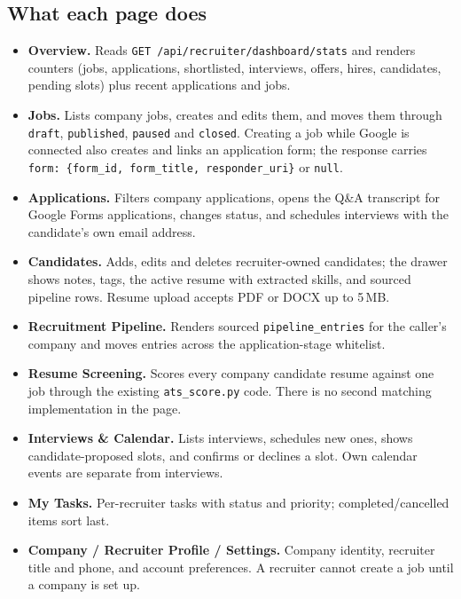 \documentclass[11pt,a4paper]{article}
\newcommand{\file}[1]{\texttt{\small #1}}
\newcommand{\code}[1]{\texttt{#1}}
\newcommand{\api}[2]{\texttt{\small #1\,#2}}
\begin{document}
\subsection{What each page does}
\begin{itemize}[leftmargin=2em]
  \item \textbf{Overview.} Reads \api{GET}{/api/recruiter/dashboard/stats}
        and renders counters (jobs, applications, shortlisted, interviews,
        offers, hires, candidates, pending slots) plus recent applications and
        jobs.
  \item \textbf{Jobs.} Lists company jobs, creates and edits them, and moves
        them through \code{draft}, \code{published}, \code{paused} and
        \code{closed}. Creating a job while Google is connected also creates
        and links an application form; the response carries
        \code{form: \{form\_id, form\_title, responder\_uri\}} or \code{null}.
  \item \textbf{Applications.} Filters company applications, opens the Q\&A
        transcript for Google Forms applications, changes status, and
        schedules interviews with the candidate's own email address.
  \item \textbf{Candidates.} Adds, edits and deletes recruiter-owned
        candidates; the drawer shows notes, tags, the active resume with
        extracted skills, and sourced pipeline rows. Resume upload accepts PDF
        or DOCX up to 5\,MB.
  \item \textbf{Recruitment Pipeline.} Renders sourced
        \code{pipeline\_entries} for the caller's company and moves entries
        across the application-stage whitelist.
  \item \textbf{Resume Screening.} Scores every company candidate resume
        against one job through the existing \file{ats\_score.py} code. There
        is no second matching implementation in the page.
  \item \textbf{Interviews \& Calendar.} Lists interviews, schedules new
        ones, shows candidate-proposed slots, and confirms or declines a slot.
        Own calendar events are separate from interviews.
  \item \textbf{My Tasks.} Per-recruiter tasks with status and priority;
        completed/cancelled items sort last.
  \item \textbf{Company / Recruiter Profile / Settings.} Company identity,
        recruiter title and phone, and account preferences. A recruiter
        cannot create a job until a company is set up.
\end{itemize}
\end{document}
